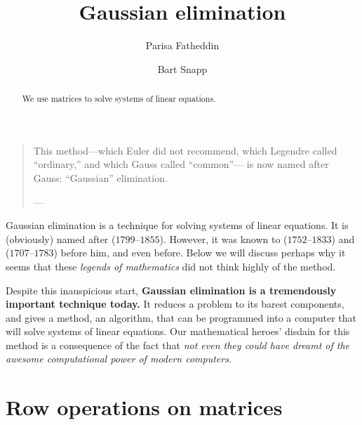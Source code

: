 \documentclass{ximera}
\author{Parisa Fatheddin \and Bart Snapp}
\title{Gaussian elimination}
\begin{document}
\begin{abstract}
  We use matrices to solve systems of linear equations.
\end{abstract}
\maketitle

\begin{quote}
  This method---which Euler did not recommend, which Legendre called ``ordinary,'' and which Gauss called ``common''--- is now named after Gauss: ``Gaussian'' elimination.


\hfill ---
\end{quote}

Gaussian elimination is a technique for solving systems of linear
equations. It is (obviously) named after
($1799$--$1855$). However, it was known to
($1752$--$1833$) and
($1707$--$1783$) before him, and even before. Below we will discuss
perhaps why it seems that these \textit{legends of mathematics} did
not think highly of the method.






Despite this inauspicious start, \textbf{Gaussian elimination is a
  tremendously important technique today.} It reduces a problem to its
barest components, and gives a method, an algorithm, that can be
programmed into a computer that will solve systems of linear
equations. Our mathematical heroes' disdain for this method is a
consequence of the fact that \textit{not even they could have dreamt
  of the awesome computational power of modern computers.}



\section{Row operations on matrices}
\end{document}
